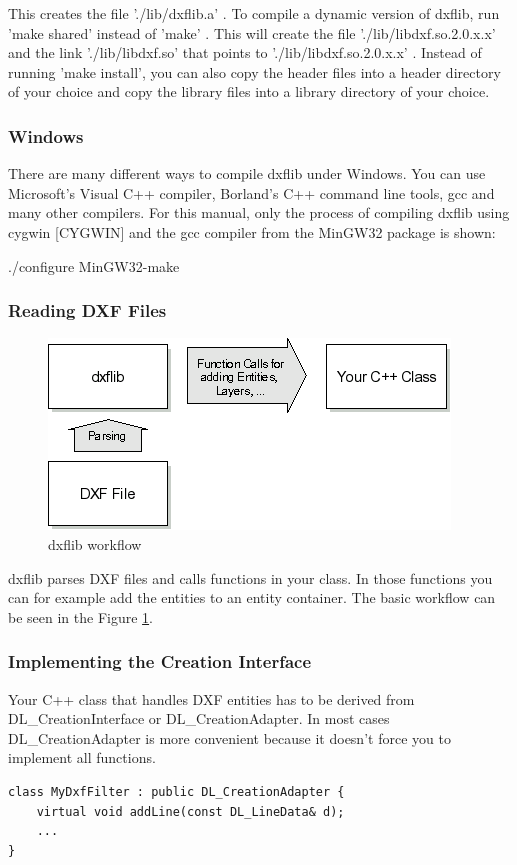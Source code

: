 This creates the file './lib/dxflib.a' . To compile a dynamic version of dxflib, run 'make shared' instead of 'make' . This will create the file 
'./lib/libdxf.so.2.0.x.x' and the link './lib/libdxf.so' that points to './lib/libdxf.so.2.0.x.x' .
Instead of running 'make install', you can also copy the header files into a header directory of your choice and copy the library files into a library directory of your choice.

\subsubsection*{Windows}
There are many different ways to compile dxflib under Windows. You can use Microsoft's Visual C++ compiler, Borland's C++ command line tools, gcc and many other compilers. 
For this manual, only the process of compiling dxflib using cygwin [CYGWIN] and the gcc compiler from the MinGW32 package is shown:
\begin{verbatim*}
./configure
MinGW32-make
\end{verbatim*}
\subsubsection{Reading DXF Files}
\begin{figure}
\centering
\includegraphics[scale=0.8]{images/dxflib.png}
\caption{dxflib workflow}
\label{fig:dxflib}
\end{figure}

dxflib parses DXF files and calls functions in your class. In those functions you can for example add the entities to an entity container. The basic workflow can be seen in the Figure \ref{fig:dxflib}.

\subsubsection{Implementing the Creation Interface}
Your C++ class that handles DXF entities has to be derived from DL\_CreationInterface or DL\_CreationAdapter. In most cases DL\_CreationAdapter is more convenient because it doesn't force you to implement all functions.
\begin{verbatim}
class MyDxfFilter : public DL_CreationAdapter {
    virtual void addLine(const DL_LineData& d);
    ...
}
\end{verbatim}


